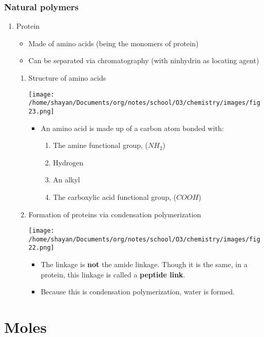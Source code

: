 \documentclass[11pt]{article}
\begin{document}
\subsubsection{Natural polymers}
\label{sec:org38ca999}
\begin{enumerate}
\item Protein
\label{sec:org38ff24b}
\begin{itemize}
\item Made of amino acids (being the monomers of protein)
\item Can be separated via chromatography (with ninhydrin as locating agent)
\end{itemize}
\begin{enumerate}
\item Structure of amino acids
\label{sec:orgc22ca33}
\begin{center}
\texttt{[image: /home/shayan/Documents/org/notes/school/O3/chemistry/images/fig23.png]}
\end{center}
\begin{itemize}
\item An amino acid is made up of a carbon atom bonded with:
\begin{enumerate}
\item The amine functional group, (\(NH_2\))
\item Hydrogen
\item An alkyl
\item The carboxylic acid functional group, (\(COOH\))
\end{enumerate}
\end{itemize}
\item Formation of proteins via condensation polymerization
\label{sec:orgdbfb8dc}
\begin{center}
\texttt{[image: /home/shayan/Documents/org/notes/school/O3/chemistry/images/fig22.png]}
\end{center}
\begin{itemize}
\item The linkage is \textbf{not} the amide linkage. Though it is the same, in a protein, this linkage is called a \textbf{peptide link}.
\item Because this is condensation polymerization, water is formed.
\end{itemize}
\end{enumerate}
\end{enumerate}
\section{Moles}
\label{sec:org40ce37b}
\end{document}

